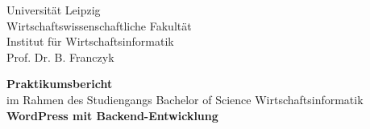 
\newcommand{\trtitleone}{WordPress mit Backend-Entwicklung}
\newcommand{\trtitletwo}{}
\newcommand{\trtype}{Bachelorarbeit zur Erlangung des akademischen Grades}
\newcommand{\trabschluss}{Bachelor of Science}
\newcommand{\trauthor}{Li, Ye}
\newcommand{\trstrasse}{Bornaische Straße 138b}
\newcommand{\trmatrikelnummer}{14524}
\newcommand{\trplz}{04279}
\newcommand{\trort}{Leipzig}
\newcommand{\tremail}{himmel609@hotmail.com}
\newcommand{\trtelefon}{012345 67890}
\newcommand{\truni}{Universität Leipzig}
\newcommand{\trfakultaet}{Wirtschaftswissenschaftliche Fakultät}
\newcommand{\trfachbereich}{Institut für Wirtschaftsinformatik}
\newcommand{\trstudiengang}{Wirtschaftsinformatik}
\newcommand{\trprofessor}{Prof. Dr. B. Franczyk}

\newcommand{\trdate}{\today}

\thispagestyle{empty}

\begin{center}
\truni\\
\trfakultaet\\
\trfachbereich\\
\trprofessor
\end{center}

\vspace{1.5cm}

\begin{center}
	\textbf{Praktikumsbericht}\\
	im Rahmen des Studiengangs Bachelor of Science Wirtschaftsinformatik\\[1cm]
	\textbf{\large \trtitleone}\\[0.1cm]
	\textbf{\large \trtitletwo}
\end{center}

\vspace{2.7cm}

